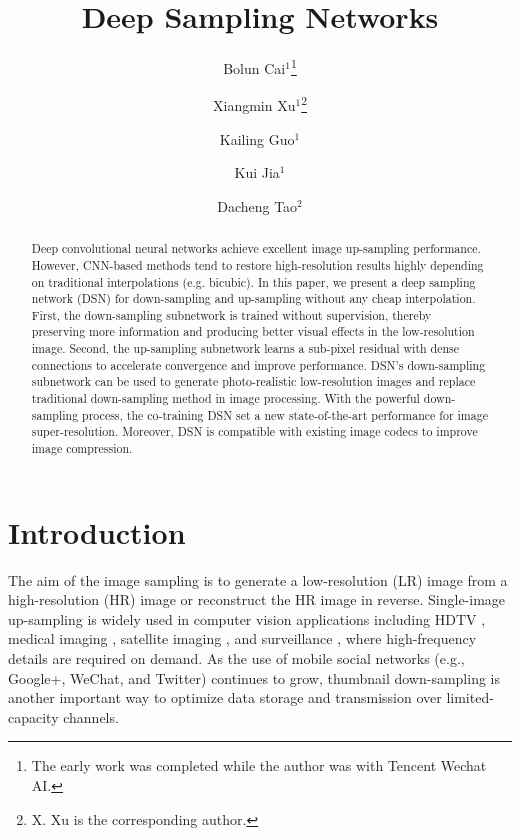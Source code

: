 \documentclass[runningheads]{llncs}
\begin{document}
\mainmatter
\def\ECCV18SubNumber{2287}  %

\title{Deep Sampling Networks} %



\author{Bolun Cai$^1$\thanks{The early work was completed while the author was with Tencent Wechat AI.} 
\and Xiangmin Xu$^{1}$\thanks{X. Xu is the corresponding author.}
\and  Kailing Guo$^1$
\and Kui Jia$^1$
\and Dacheng Tao$^2$
}


\maketitle

\begin{abstract}
Deep convolutional neural networks achieve excellent image up-sampling performance. However, CNN-based methods tend to restore high-resolution results highly depending on traditional interpolations (e.g. bicubic). In this paper, we present a deep sampling network (DSN) for down-sampling and up-sampling without any cheap interpolation. First, the down-sampling subnetwork is trained without supervision, thereby preserving more information and producing better visual effects in the low-resolution image. Second, the up-sampling subnetwork learns a sub-pixel residual with dense connections to accelerate convergence and improve performance. DSN's down-sampling subnetwork can be used to generate photo-realistic low-resolution images and replace traditional down-sampling method in image processing. With the powerful down-sampling process, the co-training DSN set a new state-of-the-art performance for image super-resolution. Moreover, DSN is compatible with existing image codecs to improve image compression.
\end{abstract}

\section{Introduction}
The aim of the image sampling is to generate a low-resolution (LR) image from a high-resolution (HR) image or reconstruct the HR image in reverse. Single-image up-sampling is widely used in computer vision applications including HDTV \cite{hdtv}, medical imaging \cite{medical}, satellite imaging \cite{satellite}, and surveillance \cite{surveillance}, where high-frequency details are required on demand. As the use of mobile social networks (e.g., Google+, WeChat, and Twitter) continues to grow, thumbnail down-sampling is another important way to optimize data storage and transmission over limited-capacity channels.
\end{document}
